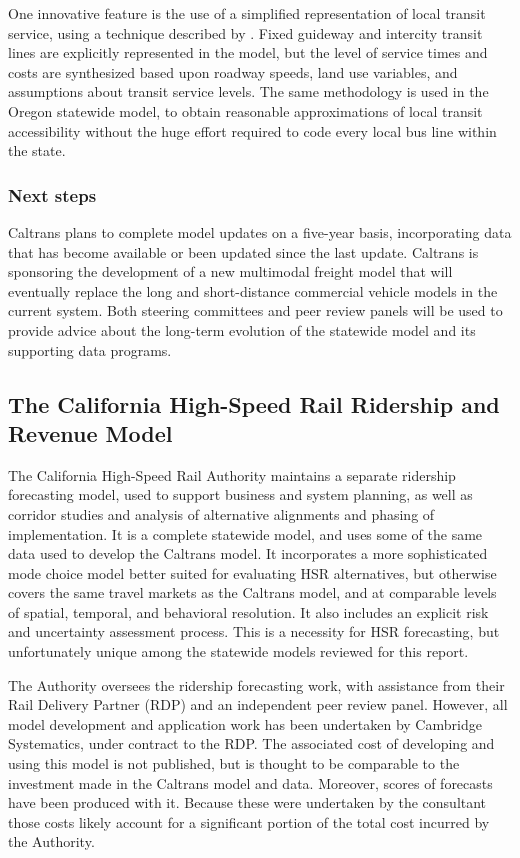 One innovative feature is the use of a simplified representation of local transit service, using a technique described by \cite{circella14}. Fixed guideway and intercity transit lines are explicitly represented in the model, but the level of service times and costs are synthesized based upon roadway speeds, land use variables, and assumptions about transit service levels. The same methodology is used in the Oregon statewide model, to obtain reasonable approximations of local transit accessibility without the huge effort required to code every local bus line within the state.

\subsubsection{Next steps}

Caltrans plans to complete model updates on a five-year basis, incorporating data that has become available or been updated since the last update. Caltrans is sponsoring the development of a new multimodal freight model that will eventually replace the long and short-distance commercial vehicle models in the current system. Both steering committees and peer review panels will be used to provide advice about the long-term evolution of the statewide model and its supporting data programs.

\subsection{The California High-Speed Rail Ridership and Revenue Model}\label{sec:california-hsr-model}

The California High-Speed Rail Authority maintains a separate ridership forecasting model, used to support business and system planning, as well as corridor studies and analysis of alternative alignments and phasing of implementation. It is a complete statewide model, and uses some of the same data used to develop the Caltrans model. It incorporates a more sophisticated mode choice model better suited for evaluating HSR alternatives, but otherwise covers the same travel markets as the Caltrans model, and at comparable levels of spatial, temporal, and behavioral resolution. It also includes an explicit risk and uncertainty assessment process. This is a necessity for HSR forecasting, but unfortunately unique among the statewide models reviewed for this report.

The Authority oversees the ridership forecasting work, with assistance from their Rail Delivery Partner (RDP) and an independent peer review panel. However, all model development and application work has been undertaken by Cambridge Systematics, under contract to the RDP. The associated cost of developing and using this model is not published, but is thought to be comparable to the investment made in the Caltrans model and data. Moreover, scores of forecasts have been produced with it. Because these were undertaken by the consultant those costs likely account for a significant portion of the total cost incurred by the Authority.

